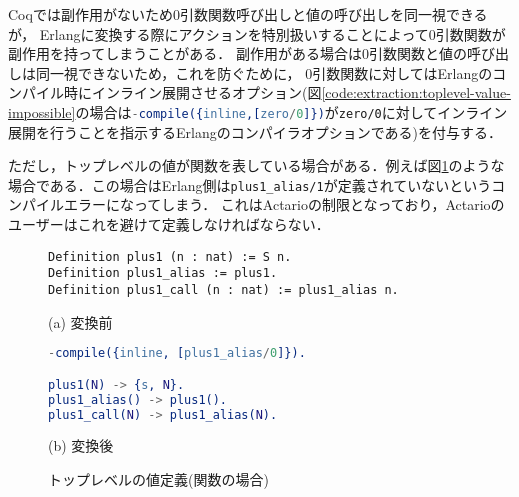 Coqでは副作用がないため0引数関数呼び出しと値の呼び出しを同一視できるが，
Erlangに変換する際にアクションを特別扱いすることによって0引数関数が副作用を持ってしまうことがある．
副作用がある場合は0引数関数と値の呼び出しは同一視できないため，これを防ぐために，
0引数関数に対してはErlangのコンパイル時にインライン展開させるオプション(図\ref{code:extraction:toplevel-value-impossible}の場合は\lstinline[language=Erlang]|-compile({inline,[zero/0]})|が\lstinline{zero/0}に対してインライン展開を行うことを指示するErlangのコンパイラオプションである)を付与する．

ただし，トップレベルの値が関数を表している場合がある．例えば図\ref{code:extraction:toplevel-value-func}のような場合である．この場合はErlang側は\lstinline{plus1_alias/1}が定義されていないというコンパイルエラーになってしまう．
これはActarioの制限となっており，Actarioのユーザーはこれを避けて定義しなければならない．


\begin{figure}\centering
\begin{minipage}{1\textwidth}\centering
\begin{lstlisting}[frame=single,numbers=none,xleftmargin=0pt]
Definition plus1 (n : nat) := S n.
Definition plus1_alias := plus1.
Definition plus1_call (n : nat) := plus1_alias n.
\end{lstlisting}
(a) 変換前
\end{minipage}
\begin{minipage}{1\textwidth}\centering
\begin{lstlisting}[frame=single,numbers=none,xleftmargin=0pt,language=Erlang]
-compile({inline, [plus1_alias/0]}).

plus1(N) -> {s, N}.
plus1_alias() -> plus1().
plus1_call(N) -> plus1_alias(N).
\end{lstlisting}
(b) 変換後
\end{minipage}
\caption{トップレベルの値定義(関数の場合)}\label{code:extraction:toplevel-value-func}
\end{figure}
